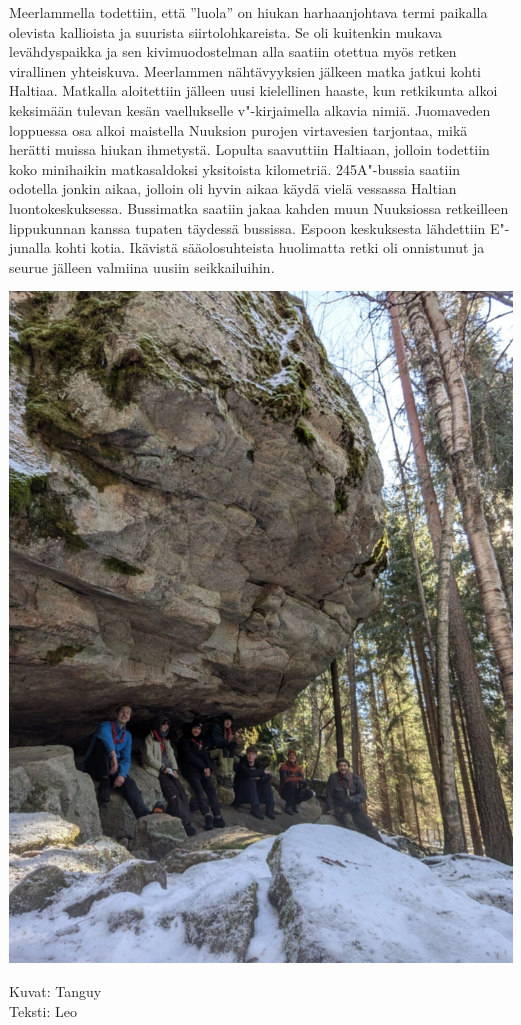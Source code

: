 \begin{multicols}{2}
Meerlammella todettiin, että ''luola'' on hiukan harhaanjohtava termi paikalla
olevista kallioista ja suurista siirtolohkareista. Se oli kuitenkin mukava
levähdyspaikka ja sen kivimuodostelman alla saatiin otettua myös retken
virallinen yhteiskuva. Meerlammen nähtävyyksien jälkeen matka jatkui kohti
Haltiaa. Matkalla aloitettiin jälleen uusi kielellinen haaste, kun retkikunta
alkoi keksimään tulevan kesän vaellukselle v"-kirjaimella alkavia nimiä.
Juomaveden loppuessa osa alkoi maistella Nuuksion purojen virtavesien
tarjontaa, mikä herätti muissa hiukan ihmetystä. Lopulta saavuttiin Haltiaan,
jolloin todettiin koko minihaikin matkasaldoksi yksitoista kilometriä.
245A"-bussia saatiin odotella jonkin aikaa, jolloin oli hyvin aikaa käydä vielä
vessassa Haltian luontokeskuksessa. Bussimatka saatiin jakaa kahden muun
Nuuksiossa retkeilleen lippukunnan kanssa tupaten täydessä bussissa. Espoon
keskuksesta lähdettiin E"-junalla kohti kotia. Ikävistä sääolosuhteista
huolimatta retki oli onnistunut ja seurue jälleen valmiina uusiin
seikkailuihin.
\columnbreak

\noindent\includegraphics[width=1.2\linewidth,trim={4cm 0 6cm 0},clip]{assets/minihaikki7}

\end{multicols}


\vspace{1cm}
\noindent\null\hfill Kuvat: Tanguy\\
\noindent\null\hfill Teksti: Leo

